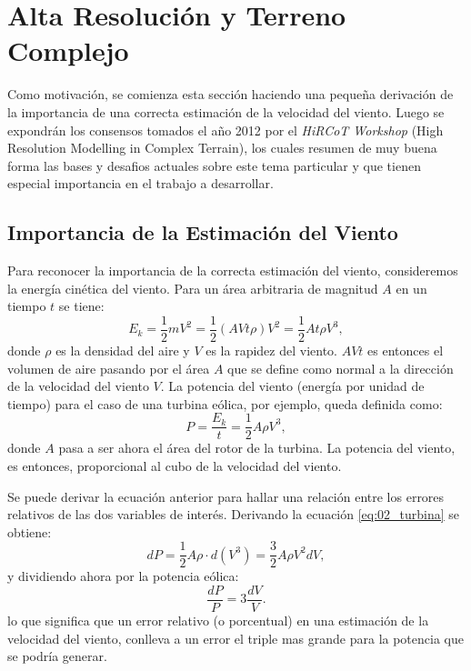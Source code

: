 \section{Alta Resolución y Terreno Complejo}
Como motivación, se comienza esta sección haciendo una pequeña derivación de la importancia de una correcta estimación de la velocidad del viento. Luego se expondrán los consensos tomados el año 2012 por el \emph{HiRCoT Workshop} (High Resolution Modelling in Complex Terrain), los cuales resumen de muy buena forma las bases y desafios actuales sobre este tema particular y que tienen especial importancia en el trabajo a desarrollar.
\subsection{Importancia de la Estimación del Viento}
Para reconocer la importancia de la correcta estimación del viento, consideremos la energía cinética del viento. Para un área arbitraria de magnitud $A$ en un tiempo $t$ se tiene:
\begin{equation} 
E_k = \frac{1}{2}mV^2 = \frac{1}{2}(AVt\rho)V^2 = \frac{1}{2}At\rho V^3,
\end{equation}
donde $\rho$ es la densidad del aire y $V$ es la rapidez del viento. $AVt$ es entonces el volumen de aire pasando por el área $A$ que se define como normal a la dirección de la velocidad del viento $V$. La potencia del viento (energía por unidad de tiempo) para el caso de una turbina eólica, por ejemplo, queda definida como:
\begin{equation}\label{eq:02_turbina}
P = \frac{E_k}{t} = \frac{1}{2}A\rho V^3,
\end{equation}
donde $A$ pasa a ser ahora el área del rotor de la turbina. La potencia del viento, es entonces, proporcional al cubo de la velocidad del viento.

Se puede derivar la ecuación anterior para hallar una relación entre los errores relativos de las dos variables de interés. Derivando la ecuación \ref{eq:02_turbina} se obtiene:
\begin{equation}
dP = \frac{1}{2}A\rho\cdot d(V^3) = \frac{3}{2}A\rho V^2 dV,
\end{equation}
y dividiendo ahora por la potencia eólica:
\begin{equation}
\frac{dP}{P} = 3\frac{dV}{V}.
\end{equation}
lo que significa que un error relativo (o porcentual) en una estimación de la velocidad del viento, conlleva a un error el triple mas grande para la potencia que se podría generar.

